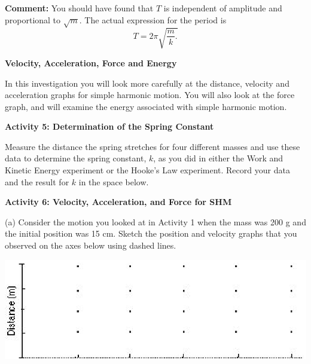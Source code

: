 \textbf{Comment:} You should have found that $T$ is independent of amplitude 
and proportional to \( \sqrt{m} \). The actual expression for the period is
\[T=2\pi \sqrt{\frac{m}{k}.}\]


\textbf{Velocity, Acceleration, Force and Energy }

In this investigation you will look more carefully at the distance, velocity
and acceleration graphs for simple harmonic motion. You will also look at the
force graph, and will examine the energy associated with simple harmonic motion.

\textbf{Activity 5: Determination of the Spring Constant }

Measure the distance the spring stretches for four different masses and use
these data to determine the spring constant, $k$, as you did in either the Work and Kinetic Energy experiment or the Hooke's Law experiment. Record your data and the result for $k$ in the space below.
\answerspace{40mm}

\textbf{Activity 6: Velocity, Acceleration, and Force for SHM} 

(a) Consider the motion you looked at in Activity 1 when the mass was 200 g
and the initial position was 15 cm. Sketch the position and velocity graphs
that you observed on the axes below using dashed lines.

\vspace{0.3cm}
{\par\centering \includegraphics{periodic_motion/periodic_motion_fig2.eps} \par}
\vspace{0.3cm}

